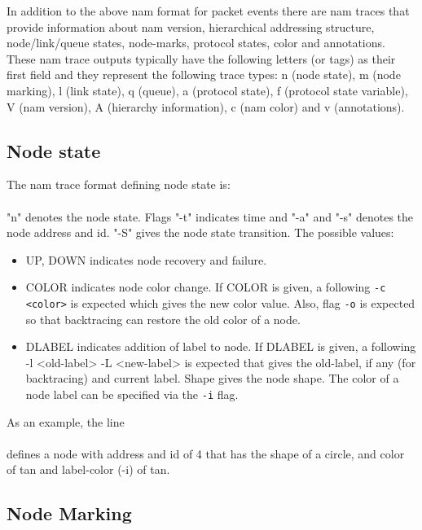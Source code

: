 In addition to the above nam format for packet events there are nam traces
that provide information about nam version, hierarchical
addressing structure, node/link/queue states, node-marks, protocol states,
color and annotations. These nam trace outputs typically have the
following letters (or tags) as their first field and they represent the
following trace types: 
n (node state), m (node marking), l (link state), q (queue), a 
(protocol state), f (protocol state variable),
V (nam version), A (hierarchy information), c (nam color) and v
(annotations).

\subsection{Node state}

The nam trace format defining node state is:\\
\\
"n" denotes the node state. Flags "-t" indicates time and "-a" and "-s"
denotes the node address and id. "-S" gives the node state transition.
The possible values: 
\begin{itemize}
\item UP, DOWN indicates node recovery and failure.
\item COLOR indicates node color change. If COLOR is given, a
  following {\tt -c <color>} is expected which gives the new color
  value. Also, flag {\tt -o} is expected so that backtracing can
  restore the old color of a node. 
\item DLABEL indicates addition of label to node. If DLABEL is
  given, a following -l <old-label> -L <new-label> is expected that gives
  the old-label, if any (for backtracing) and current label. Shape gives
  the node shape. The color of a node label can be specified via the
  {\tt -i} flag. 
\end{itemize}
As an example, the line\\
\\
defines a node with address and id of 4 that has the shape of a
circle, and color of tan and label-color (-i) of tan.

\subsection{Node Marking}

